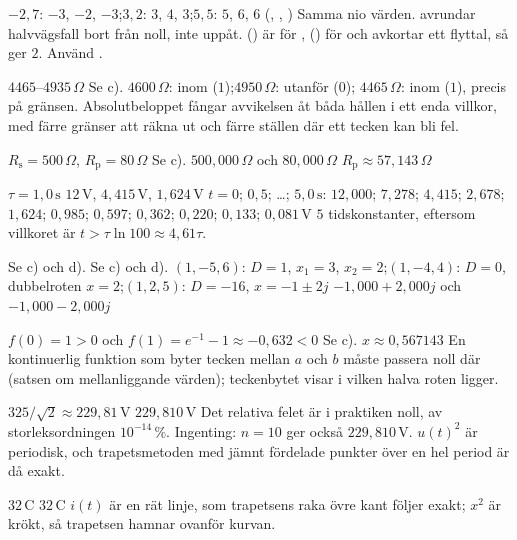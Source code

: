 \begin{facit}
  $-2{,}7$: $-3$, $-2$, $-3$;\enspace $3{,}2$: $3$, $4$, $3$;\enspace $5{,}5$: $5$,
$6$, $6$ (, , )
 Samma nio värden.
  avrundar halvvägsfall bort från noll, inte uppåt.
  () är för ,  () för
 och avkortar ett flyttal, så  ger $2$. Använd .

  $4465$--$4935\,\Omega$
 Se c).
 $4600\,\Omega$: inom ($1$);\enspace $4950\,\Omega$: utanför ($0$);\enspace
$4465\,\Omega$: inom ($1$), precis på gränsen.
 Absolutbeloppet fångar avvikelsen åt båda hållen i ett enda villkor, med färre gränser att
räkna ut och färre ställen där ett tecken kan bli fel.

  $R_{\text{s}} = 500\,\Omega$, $R_{\text{p}} = 80\,\Omega$
 Se c).
 $500{,}000\,\Omega$ och $80{,}000\,\Omega$
 $R_{\text{p}} \approx 57{,}143\,\Omega$

  $\tau = 1{,}0\,\text{s}$
 $12\,\text{V}$, $4{,}415\,\text{V}$, $1{,}624\,\text{V}$
 $t = 0$; $0{,}5$; \ldots; $5{,}0\,\text{s}$: $12{,}000$; $7{,}278$; $4{,}415$; $2{,}678$;
$1{,}624$; $0{,}985$; $0{,}597$; $0{,}362$; $0{,}220$; $0{,}133$; $0{,}081\,\text{V}$
 $5$ tidskonstanter, eftersom villkoret är $t > \tau \ln 100 \approx 4{,}61\tau$.

  Se c) och d).  Se c) och d).
 $(1, -5, 6)$: $D = 1$, $x_1 = 3$, $x_2 = 2$;\enspace $(1, -4, 4)$: $D = 0$, dubbelroten
$x = 2$;\enspace $(1, 2, 5)$: $D = -16$, $x = -1 \pm 2j$
 $-1{,}000 + 2{,}000j$ och $-1{,}000 - 2{,}000j$

  $f(0) = 1 > 0$ och $f(1) = e^{-1} - 1 \approx -0{,}632 < 0$
 Se c).
 $x \approx 0{,}567143$
 En kontinuerlig funktion som byter tecken mellan $a$ och $b$ måste passera noll där
(satsen om mellanliggande värden); teckenbytet visar i vilken halva roten ligger.

  $325/\sqrt{2} \approx 229{,}81\,\text{V}$
 $229{,}810\,\text{V}$
 Det relativa felet är i praktiken noll, av storleksordningen $10^{-14}\,\%$.
 Ingenting: $n = 10$ ger också $229{,}810\,\text{V}$. $u(t)^2$ är periodisk, och
trapetsmetoden med jämnt fördelade punkter över en hel period är då exakt.

  $32\,\text{C}$  $32\,\text{C}$
 $i(t)$ är en rät linje, som trapetsens raka övre kant följer exakt; $x^2$ är krökt, så
trapetsen hamnar ovanför kurvan.


\end{facit}
